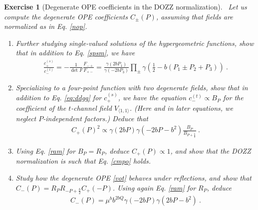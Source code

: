 \documentclass[12pt, a4paper, notitlepage, twoside]{report}
\numberwithin{equation}{section}
\theoremstyle{break}
\newtheorem{exo}{Exercise}[chapter]
\begin{document}
\begin{exo}[Degenerate OPE coefficients in the DOZZ normalization]
 ~\label{exodoc}
 Let us compute the degenerate OPE coefficients $C_\pm(P)$, assuming that fields are normalized as in Eq. \eqref{nop}.
\begin{enumerate}
 \item Further studying single-valued solutions of the hypergeometric functions, show that in addition to Eq. \eqref{spsm}, we have 
 \begin{align}
  \frac{c_+^{(s)}}{c_-^{(t)}} = -\frac{1}{\det F}\frac{F_{-+}}{F_{+-}} = \frac{\gamma(2bP_1)}{\gamma(-2bP_3)}\prod_\pm \gamma\left(\tfrac12-b(P_1\pm P_2+P_3)\right)\ .
 \end{align}
\item Specializing to a four-point function with two degenerate fields,
show that in addition to Eq. \eqref{eq:ddgg} for $c_+^{(s)}$, we have the equation
$
 c_-^{(t)} \propto B_{P}
$ for the coefficient of the $t$-channel field $V_{\langle 1,1\rangle}$. 
(Here and in later equations, 
we neglect $P$-independent factors.) Deduce that 
\begin{align}
 C_+(P)^2 \propto \gamma(2bP)\gamma(-2bP-b^2) \frac{B_P}{B_{P+\frac{b}{2}}}\ .
\end{align}
\item Using Eq. \eqref{ram} for $B_P=R_P$, deduce $C_+(P)\propto 1$, and show that the DOZZ normalization is such that Eq. \eqref{cmpo} holds. 
\item
Study how the degenerate OPE \eqref{vot} behaves under reflections, and show that $C_-(P) = R_PR_{-P+\frac{b}{2}}C_+(-P)$. Using again Eq. \eqref{ram} for $R_P$, deduce
\begin{align}
 C_-(P) = \mu^b b^{2bQ} \gamma(-2bP)\gamma(2bP-b^2)\ .
\end{align}
\end{enumerate}
 \end{exo}
\end{document}
